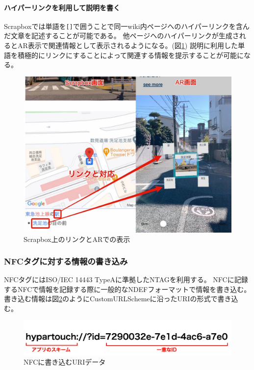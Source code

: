 \paragraph*{ハイパーリンクを利用して説明を書く}
Scrapboxでは単語を\texttt{[]}で囲うことで同一wiki内ページへのハイパーリンクを含んだ文章を記述することが可能である。
他ページヘのハイパーリンクが生成されるとAR表示で関連情報として表示されるようになる。(図\ref{fig:scrapbox_link_and_ar})
説明に利用した単語を積極的にリンクにすることによって関連する情報を提示することが可能になる。

\begin{figure}[h]
  \centering
  \includegraphics[width=120mm]{images/scrapbox_link_and_ar.jpg}
  \caption{Scrapbox上のリンクとARでの表示} \label{fig:scrapbox_link_and_ar}
\end{figure}

\subsubsection{NFCタグに対する情報の書き込み}
NFCタグにはISO/IEC 14443 TypeAに準拠したNTAGを利用する。
NFCに記録するNFCで情報を記録する際に一般的なNDEFフォーマットで情報を書き込む。
書き込む情報は図\ref{fig:nfc_uri}のようにCustomURLSchemeに沿ったURIの形式で書き込む。

\begin{figure}[h]
  \centering
  \includegraphics[width=120mm]{images/nfc_uri.png}
  \caption{NFCに書き込むURIデータ} \label{fig:nfc_uri}
\end{figure}

